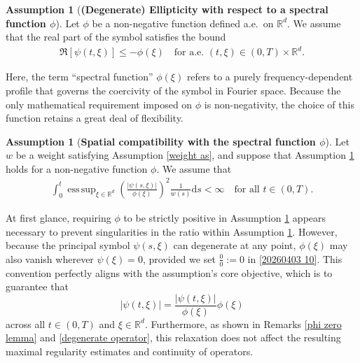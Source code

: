 \documentclass[11pt,reqno]{amsart}
\theoremstyle{definition}
\newtheorem{assumption}[thm]{Assumption}
\theoremstyle{remark}
\newcommand\bR{\mathbb{R}}
\DeclareMathOperator*{\esssup}{ess\,sup}
\numberwithin{equation}{section}
\begin{document}
\begin{assumption}[\textbf{(Degenerate) Ellipticity with respect to a spectral function $\phi$}]
									\label{main as 4}
Let $\phi$ be a non-negative function defined a.e.\ on $\bR^d$. 
We assume that the real part of the symbol satisfies the bound
\begin{align}
									\label{elliptic con phi}
\Re[\psi(t,\xi)] \leq -\phi(\xi) \quad \text{for a.e. } (t,\xi) \in (0,T) \times \bR^d.
\end{align}
\end{assumption}

Here, the term ``spectral function'' $\phi(\xi)$ refers to a purely frequency-dependent profile that governs the coercivity of the symbol in Fourier space. 
Because the only mathematical requirement imposed on $\phi$ is non-negativity, the choice of this function retains a great deal of flexibility.

\begin{assumption}[\textbf{Spatial compatibility with the spectral function $\phi$}]
										\label{main as 5}
Let $w$ be a weight satisfying Assumption \ref{weight as}, and suppose that Assumption \ref{main as 4} holds for a non-negative function $\phi$. We assume that
\begin{align}
										\label{20260403 10}
\int_0^t \esssup_{\xi \in \bR^d} \left( \frac{|\psi(s,\xi)|}{\phi(\xi)} \right)^2 \frac{1}{w(s)} \mathrm{d}s < \infty \quad \text{for all } t \in (0,T).
\end{align}
\end{assumption}

At first glance, requiring $\phi$ to be strictly positive in Assumption \ref{main as 4} appears necessary to prevent singularities in the ratio within Assumption \ref{main as 5}. 
However, because the principal symbol $\psi(s,\xi)$ can degenerate at any point, 
$\phi(\xi)$ may also vanish wherever $\psi(\xi) = 0$, provided we set $\frac{0}{0} := 0$ in \eqref{20260403 10}. 
This convention perfectly aligns with the assumption's core objective, which is to guarantee that
$$
|\psi(t,\xi)| = \frac{|\psi(t,\xi)|}{\phi(\xi)} \phi(\xi)
$$
across all $t \in (0,T)$ and $\xi \in \bR^d$. 
Furthermore, as shown in Remarks \ref{phi zero lemma} and \ref{degenerate operator}, this relaxation does not affect the resulting maximal regularity estimates and continuity of operators.
\end{document}
